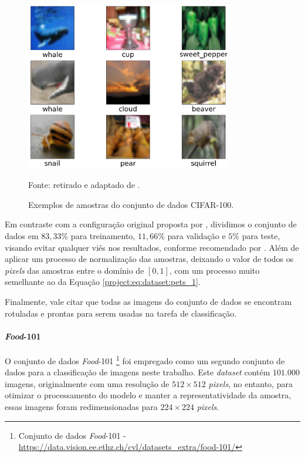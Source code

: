 \begin{figure}[H]
    \centering
    \caption{Exemplos de amostras do conjunto de dados CIFAR-100.}
    \includegraphics[width=0.8\textwidth]{recursos/imagens/project/cifar100v2.png}
    \label{project:fig:dataset:cifar}

    Fonte: retirado e adaptado de \cite{Krizhevsky2014TheDataset}.
\end{figure}

Em contraste com a configuração original proposta por \cite{Krizhevsky2014TheDataset}, dividimos o conjunto de dados em $83,33\%$ para treinamento, $11,66\%$ para validação e $5\%$ para teste, visando evitar qualquer viés nos resultados, conforme recomendado por \cite{Domingos2012ALearning}. Além de aplicar um processo de normalização das amostras, deixando o valor de todos os \textit{pixels} das amostras entre o domínio de $[0, 1]$, com um processo muito semelhante ao da Equação \ref{project:eq:dataset:pets_1}.

Finalmente, vale citar que todas as imagens do conjunto de dados se encontram rotuladas e prontas para serem usadas na tarefa de classificação.

\paragraph{\textit{Food}-101}
\label{project:dataset:food101}
O conjunto de dados \textit{Food}-101 \footnote{Conjunto de dados \textit{Food}-101 - \url{https://data.vision.ee.ethz.ch/cvl/datasets_extra/food-101/}} \citep{Bossard2014Food-101Forests} foi empregado como um segundo conjunto de dados para a classificação de imagens neste trabalho. Este \textit{dataset} contém $101.000$ imagens, originalmente com uma resolução de $512 \times 512$ \textit{pixels}, no entanto, para otimizar o processamento do modelo e manter a representatividade da amostra, essas imagens foram redimensionadas para $224 \times 224$ \textit{pixels}.

